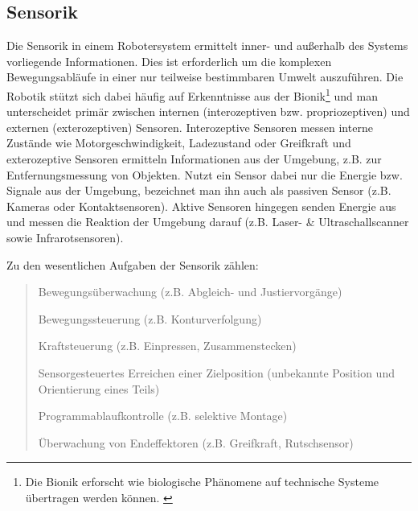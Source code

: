 \documentclass[11pt,ngerman,parskip=half]{scrartcl}
\begin{document}
\subsection{Sensorik}
\label{subsec:john_sensorik}
Die Sensorik in einem Robotersystem ermittelt inner- und außerhalb des
Systems vorliegende Informationen. Dies ist erforderlich um die komplexen
Bewegungsabläufe in einer nur teilweise bestimmbaren Umwelt auszuführen. Die
Robotik stützt sich dabei häufig auf Erkenntnisse aus der Bionik\footnote{
Die Bionik erforscht wie biologische Phänomene auf technische Systeme
übertragen werden können. \parencite[vgl.][]{feess_definition:_2018}} und man
unterscheidet primär zwischen internen (interozeptiven bzw. propriozeptiven)
und externen (exterozeptiven) Sensoren. Interozeptive Sensoren messen interne
Zustände wie Motorgeschwindigkeit, Ladezustand oder Greifkraft und
exterozeptive Sensoren ermitteln Informationen aus der Umgebung, z.B. zur
Entfernungsmessung von Objekten. Nutzt ein Sensor dabei nur die Energie bzw.
Signale aus der Umgebung, bezeichnet man ihn auch als passiven Sensor (z.B.
Kameras oder Kontaktsensoren). Aktive Sensoren hingegen senden Energie aus
und messen die Reaktion der Umgebung darauf (z.B. Laser- \&
Ultraschallscanner sowie Infrarotsensoren).
\parencites[vgl.][23\psq]{hertzberg_mobile_2012}[][73]
{kruse_mehrobjekt-zustandsschatzung_2013}[][97]{hesse_taschenbuch_2016}

Zu den wesentlichen Aufgaben der Sensorik zählen:
\blockquote[{\cite[][97]{hesse_taschenbuch_2016}}]{
  \begin{compactitem}
    \item Bewegungsüberwachung (z.B. Abgleich- und Justiervorgänge)
    \item Bewegungssteuerung (z.B. Konturverfolgung)
    \item Kraftsteuerung (z.B. Einpressen, Zusammenstecken)
    \item Sensorgesteuertes Erreichen einer Zielposition (unbekannte Position
          und Orientierung eines Teils)
    \item Programmablaufkontrolle (z.B. selektive Montage)
    \item Überwachung von Endeffektoren (z.B. Greifkraft, Rutschsensor)
  \end{compactitem}
}
\end{document}
